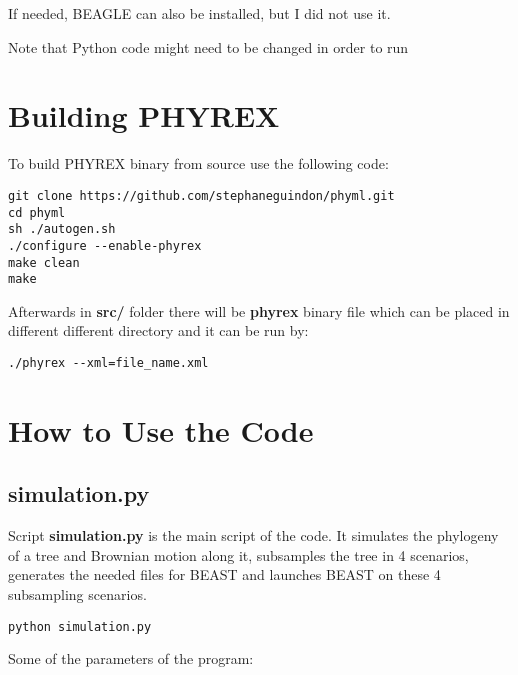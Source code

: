 If needed, BEAGLE can also be installed, but I did not use it.

Note that Python code might need to be changed in order to run 


\section*{Building PHYREX}
To build PHYREX binary from source use the following code:
\begin{verbatim}
git clone https://github.com/stephaneguindon/phyml.git
cd phyml
sh ./autogen.sh
./configure --enable-phyrex
make clean
make
\end{verbatim}

Afterwards in \textbf{src/} folder there will be \textbf{phyrex} binary file which can be placed in different different directory and it can be run by:

\begin{verbatim}
./phyrex --xml=file_name.xml
\end{verbatim}

\clearpage

\section*{How to Use the Code}



\subsection*{simulation.py}


Script \textbf{simulation.py} is the main script of the code. It simulates the phylogeny of a tree and Brownian motion along it, subsamples the tree in 4 scenarios, generates the needed files for BEAST and launches BEAST on these 4 subsampling scenarios.

\begin{verbatim}
python simulation.py 
\end{verbatim}

Some of the parameters of the program:

